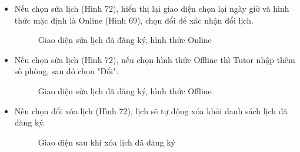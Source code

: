\begin{itemize}
    \item Nếu chọn sửa lịch (Hình 72), hiển thị lại giao diện chọn lại ngày giờ và hình thức mặc định là Online (Hình 69), chọn đổi để xác nhận đổi lịch.
    \begin{figure}[H]
    \centering
    \setlength{\fboxsep}{2pt}     
    \setlength{\fboxrule}{0.5pt}   
    \caption{Giao diện sửa lịch đã đăng ký, hình thức Online}
    \end{figure}
    \item Nếu chọn sửa lịch (Hình 72), nếu chọn hình thức Offline thì Tutor nhập thêm số phòng, sau đó chọn "Đổi".
    \begin{figure}[H]
    \centering
    \setlength{\fboxsep}{2pt}     
    \setlength{\fboxrule}{0.5pt}   
    \caption{Giao diện sửa lịch đã đăng ký, hình thức Offline}
    \end{figure}
    \item Nếu chọn đổi xóa lịch (Hình 72), lịch sẽ tự động xóa khỏi danh sách lịch đã đăng ký.
    \begin{figure}[H]
    \centering
    \setlength{\fboxsep}{2pt}     
    \setlength{\fboxrule}{0.5pt}   
    \caption{Giao diện sau khi xóa lịch đã đăng ký}
    \end{figure}
\end{itemize}
